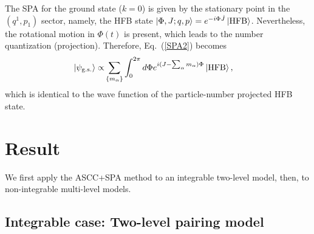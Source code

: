 \documentclass[11pt]{book} %
\begin{document}
The SPA for the ground state ($k=0$) is given by the stationary point
in the $(q^1,p_1)$ sector,
namely, the HFB state $\ket{\Phi,J;q,p}=e^{-i\Phi\hat{J}}\ket{\rm HFB}$.
Nevertheless, the rotational motion in $\Phi(t)$ is present,
which leads to the number quantization (projection).
Therefore, Eq.~(\ref{SPA2}) becomes
\begin{align}
	\ket{\psi_{\rm g.s.}} \propto& \sum_{\{m_\alpha\}}
	\int_0^{2\pi} d\Phi e^{i(J-\sum_\alpha m_\alpha)\Phi}
	\ket{\rm HFB},  
	\label{SPA3}
\end{align}
which is identical to the wave function of the particle-number projected HFB state.


\section{Result}
\label{4-3}
We first apply the ASCC+SPA method to an integrable two-level model,
then, to non-integrable multi-level models.

\subsection{Integrable case: Two-level pairing model}
\end{document}
